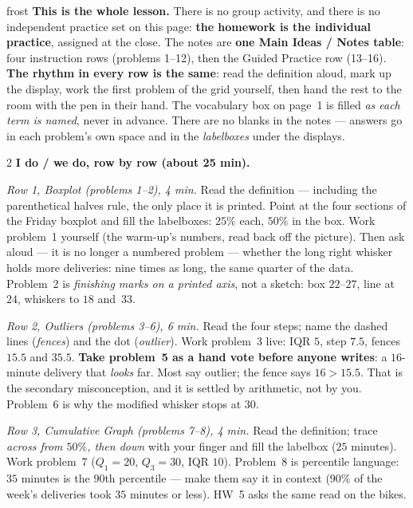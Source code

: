 \documentclass[10pt]{article}
\begin{document}
\boxguard
\begin{skillbox}{frost}
\textbf{This is the whole lesson.} There is no group activity, and there is no independent
practice set on this page: \textbf{the homework is the individual practice}, assigned at the
close. The notes are \textbf{one Main Ideas / Notes table}: four instruction rows (problems
1--12), then the Guided Practice row (13--16). \textbf{The rhythm in every row is the same}:
read the definition aloud, mark up the display, work the first problem of the grid yourself,
then hand the rest to the room with the pen in their hand. The vocabulary box on page~1 is
filled \emph{as each term is named}, never in advance. There are no blanks in the notes ---
answers go in each problem's own space and in the \emph{labelboxes} under the displays.
\begin{multicols}{2}
\textbf{I do / we do, row by row (about 25 min).}

\emph{Row 1, Boxplot (problems 1--2), 4 min.} Read the definition --- including the
parenthetical halves rule, the only place it is printed. Point at the four sections of the
Friday boxplot and fill the labelboxes: $25\%$ each, $50\%$ in the box. Work problem~1 yourself
(the warm-up's numbers, read back off the picture). Then ask aloud --- it is no longer a
numbered problem --- whether the long right whisker holds more deliveries: nine times as long,
the same quarter of the data. Problem~2 is \emph{finishing marks on a printed axis}, not a
sketch: box $22$--$27$, line at $24$, whiskers to $18$ and~$33$.

\emph{Row 2, Outliers (problems 3--6), 6 min.} Read the four steps; name the dashed lines
(\emph{fences}) and the dot (\emph{outlier}). Work problem~3 live: IQR $5$, step $7.5$, fences
$15.5$ and $35.5$. \textbf{Take problem~5 as a hand vote before anyone writes}: a $16$-minute
delivery that \emph{looks} far. Most say outlier; the fence says $16 > 15.5$. That is the
secondary misconception, and it is settled by arithmetic, not by you. Problem~6 is why the
modified whisker stops at $30$.

\emph{Row 3, Cumulative Graph (problems 7--8), 4 min.} Read the definition; trace
\emph{across from $50\%$, then down} with your finger and fill the labelbox ($25$ minutes).
Work problem~7 ($Q_1 = 20$, $Q_3 = 30$, IQR $10$). Problem~8 is percentile language: $35$
minutes is the $90$th percentile --- make them say it in context ($90\%$ of the week's
deliveries took $35$ minutes or less). HW~5 asks the same read on the bikes.


\end{multicols}
\end{skillbox}
\end{document}
